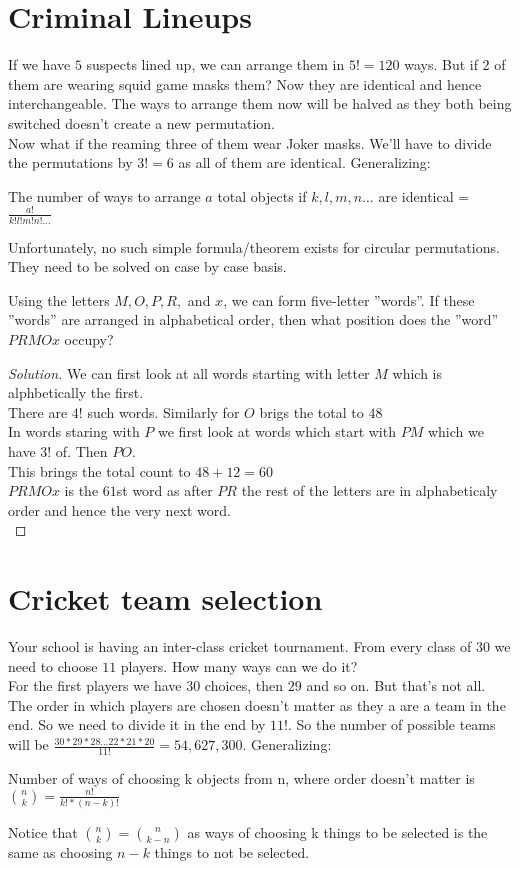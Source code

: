 \section{Criminal Lineups}
If we have $5$ suspects lined up, we can arrange them in $5!=120$ ways. But if 2 of them are wearing squid game masks them? Now they are identical and hence interchangeable. The ways to arrange them now will be halved as they both being switched doesn't create a new permutation.\\
Now what if the reaming three of them wear Joker masks. We'll have to divide the permutations by $3!=6$ as all of them are identical.  Generalizing:
\begin{theorem}
    The number of ways to arrange $a$ total objects if $k, l, m, n \dots$ are identical = $\frac{a!}{k!l!m!n! \dots}$
\end{theorem}
Unfortunately,  no such simple formula/theorem exists for circular permutations. They need to be solved on case by case basis.
\begin{example}
    Using the letters $M, O, P, R,$ and $x$, we can form five-letter ”words”. If these ”words” are arranged in alphabetical order, then what position does the ”word” $PRMOx$ occupy?
\end{example}
\begin{proof}
    [Solution]
    We can first look at all words starting with letter $M$ which is alphbetically the first.\\
    There are $4!$ such words. Similarly for $O$ brigs the total to $48$\\
    In words staring with $P$ we first look at words which start with $PM$ which we have $3!$ of. Then $PO$.\\
    This brings the total count to $48+12=60$\\
    $PRMOx$ is the $61$st word as after $PR$ the rest of the letters are in alphabeticaly order and hence the very next word.\\
\end{proof}
\section{Cricket team selection}
Your school is having an inter-class cricket tournament. From every class of $30$ we need to choose $11$ players. How many ways can we do it?\\
For the first players we have $30$ choices, then $29$ and so on. But that's not all. The order in which players are chosen doesn't matter as they a are a team in the end. So we need to divide it in the end by $11!$. So the number of possible teams will be $\frac{30*29*28 \dots 22*21 *20}{11!}=54,627,300$. Generalizing:\\
\begin{theorem}
    Number of ways of choosing k objects from n, where order doesn't matter is $\binom{n}{k}=\frac{n!}{k!*(n-k)!}$
\end{theorem}
\begin{theorem}
    [Remark]
    Notice that $\binom{n}{k}=\binom{n}{k-n}$ as ways of choosing k things to be selected is the same as choosing $n-k$ things to not be selected.
\end{theorem}

